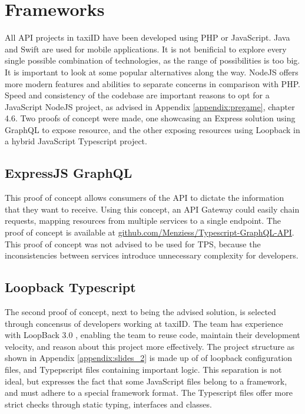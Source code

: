 %
\section{Frameworks}
All API projects in taxiID have been developed using PHP or JavaScript. Java and Swift are used for mobile applications. It is not benificial to explore every single possible combination of technologies, as the range of possibilities is too big. It is important to look at some popular alternatives along the way. NodeJS offers more modern features and abilities to separate concerns in comparison with PHP. Speed and consistency of the codebase are important reasons to opt for a JavaScript NodeJS project, as advised in Appendix \ref{appendix:pregame}, chapter 4.6. Two proofs of concept were made, one showcasing an Express solution using GraphQL to expose resource, and the other exposing resources using Loopback in a hybrid JavaScript Typescript project.

\subsection{ExpressJS GraphQL}
This proof of concept allows consumers of the API to dictate the information that they want to receive. Using this concept, an API Gateway could easily chain requests, mapping resources from multiple services to a single endpoint. The proof of concept is available at \url{github.com/Menziess/Typescript-GraphQL-API}. This proof of concept was not advised to be used for TPS, because the inconsistencies between services introduce unnecessary complexity for developers.

\subsection{Loopback Typescript}
The second proof of concept, next to being the advised solution, is selected through concensus of developers working at taxiID. The team has experience with LoopBack 3.0 \cite{lb}, enabling the team to reuse code, maintain their development velocity, and reason about this project more effectively. The project structure as shown in Appendix \ref{appendix:slides_2} is made up of of loopback configuration files, and Typepscript files containing important logic. This separation is not ideal, but expresses the fact that some JavaScript files belong to a framework, and must adhere to a special framework format. The Typescript files offer more strict checks through static typing, interfaces and classes.

